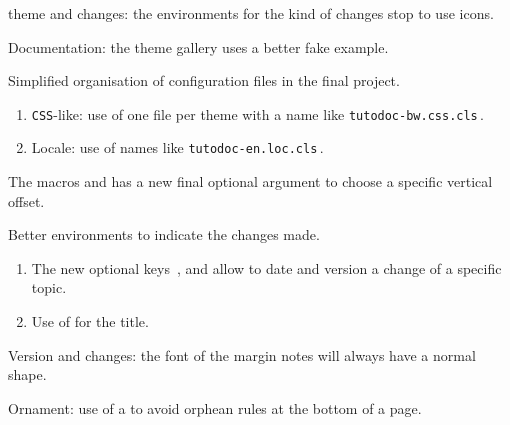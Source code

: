 \begin{tdocupdate}
	\item {} theme and changes: the environments for the kind of changes stop to use icons.

	\item Documentation: the theme gallery uses a better fake example.
\end{tdocupdate}



\begin{tdoctech}
	\item Simplified organisation of configuration files in the final project.
	\begin{enumerate}
		\item \texttt{CSS}-like: use of one file per theme with a name like \texttt{tutodoc-bw.css.cls}\,.

		\item Locale: use of names like \texttt{tutodoc-en.loc.cls}\,.
	\end{enumerate}
\end{tdoctech}

\tdocsep




\begin{tdocnew}[version = 1.6.2, date = 2024-10-30]
	\item The macros  and  has a new final optional argument  to choose a specific vertical offset.

	\item Better environments to indicate the changes made.
	\begin{enumerate}
        \item The new optional keys \,,  and  allow to date and version a change of a specific topic.

        \item Use of  for the title.
	\end{enumerate}
\end{tdocnew}


\begin{tdocupdate}
	\item Version and changes: the font of the margin notes will always have a normal shape.

	\item Ornament: use of a \tdoclatexin{\cleaders} to avoid orphean rules at the bottom of a page.
\end{tdocupdate}

